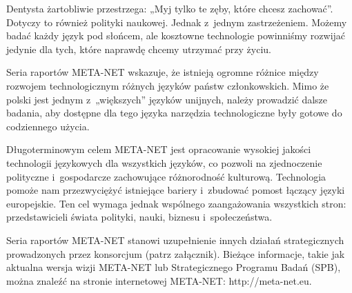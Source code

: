 \begin{multicols}{2}

Dentysta żartobliwie przestrzega: „Myj tylko te zęby, które
chcesz zachować”. Dotyczy to również polityki naukowej. Jednak
z~jednym zastrzeżeniem. Możemy badać każdy język pod słońcem,
ale kosztowne technologie powinniśmy rozwijać jedynie dla tych,
które naprawdę chcemy utrzymać przy życiu. 

Seria raportów META-NET wskazuje, że istnieją ogromne różnice
między rozwojem technologicznym różnych języków państw
członkowskich. Mimo że polski jest jednym z~„większych”
języków unijnych, należy prowadzić dalsze badania, aby dostępne
dla tego języka narzędzia technologiczne były gotowe do codziennego
użycia. 

Długoterminowym celem META-NET jest opracowanie wysokiej jakości
technologii językowych dla wszystkich języków, co pozwoli na
zjednoczenie polityczne i~gospodarcze zachowujące różnorodność
kulturową. Technologia pomoże nam przezwyciężyć istniejące
bariery i~zbudować pomost łączący języki europejskie. Ten cel
wymaga jednak wspólnego zaangażowania wszystkich stron:
przedstawicieli świata polityki, nauki, biznesu i~społeczeństwa. 

Seria raportów META-NET stanowi uzupełnienie innych działań
strategicznych prowadzonych przez konsorcjum (patrz załącznik).
Bieżące informacje, takie jak aktualna wersja wizji
META-NET\cite{Meta1} lub Strategicznego Programu Badań (SPB), można
znaleźć na stronie internetowej META-NET: http://meta-net.eu. 

\end{multicols} \clearpage 


